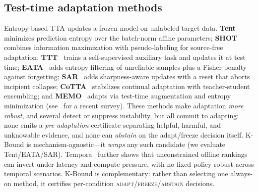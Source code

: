 \documentclass[conference]{IEEEtran}
\theoremstyle{plain}
\theoremstyle{definition}
\begin{document}
\subsection{Test-time adaptation methods}
Entropy-based TTA updates a frozen model on unlabeled target data. \textbf{Tent}~\cite{wang2021tent} minimizes
prediction entropy over the batch-norm affine parameters; \textbf{SHOT}~\cite{liang2020shot} combines information
maximization with pseudo-labeling for source-free adaptation; \textbf{TTT}~\cite{sun2020ttt} trains a
self-supervised auxiliary task and updates it at test time; \textbf{EATA}~\cite{niu2022eata} adds entropy
filtering of unreliable samples plus a Fisher penalty against forgetting; \textbf{SAR}~\cite{niu2023sar}
adds sharpness-aware updates with a reset that aborts incipient collapse; \textbf{CoTTA}~\cite{wang2022cotta}
stabilizes continual adaptation with teacher-student ensembling; and \textbf{MEMO}~\cite{zhang2022memo}
adapts via test-time augmentation and entropy minimization (see~\cite{liang2025ttasurvey} for a recent survey). These methods make
adaptation \emph{more robust}, and several detect or suppress instability, but all commit to
adapting: none emits a \emph{pre-adaptation} certificate separating helpful, harmful, and
unknowable evidence, and none can \emph{abstain} on the adapt/freeze decision itself. K-Bound
is mechanism-agnostic---it \emph{wraps} any such candidate (we evaluate Tent/EATA/SAR).
Tempora~\cite{tempora2026} further shows that unconstrained offline rankings can invert under
latency and compute pressure, with no fixed policy robust across temporal scenarios. K-Bound is
complementary: rather than selecting one always-on method, it certifies per-condition
\textsc{adapt}/\textsc{freeze}/\textsc{abstain} decisions.
\end{document}

